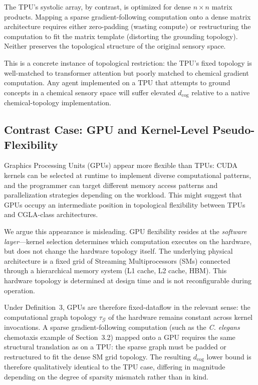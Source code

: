 \documentclass[12pt]{article}
\begin{document}
The TPU's systolic array, by contrast, is optimized for dense $n \times n$
matrix products. Mapping a sparse gradient-following computation onto a
dense matrix architecture requires either zero-padding (wasting compute)
or restructuring the computation to fit the matrix template (distorting
the grounding topology). Neither preserves the topological structure of
the original sensory space.

This is a concrete instance of topological restriction: the TPU's fixed
topology is well-matched to transformer attention but poorly matched to
chemical gradient computation. Any agent implemented on a TPU that
attempts to ground concepts in a chemical sensory space will suffer
elevated $d_{\mathrm{cog}}$ relative to a native chemical-topology
implementation.

\subsection{Contrast Case: GPU and Kernel-Level Pseudo-Flexibility}

Graphics Processing Units (GPUs) appear more flexible than TPUs:
CUDA kernels can be selected at runtime to implement diverse
computational patterns, and the programmer can target different
memory access patterns and parallelization strategies depending on
the workload. This might suggest that GPUs occupy an intermediate
position in topological flexibility between TPUs and CGLA-class
architectures.

We argue this appearance is misleading. GPU flexibility resides
at the \emph{software layer}---kernel selection determines which
computation executes on the hardware, but does not change the
hardware topology itself. The underlying physical architecture is
a fixed grid of Streaming Multiprocessors (SMs) connected through
a hierarchical memory system (L1 cache, L2 cache, HBM). This
hardware topology is determined at design time and is not
reconfigurable during operation.

Under Definition~3, GPUs are therefore fixed-dataflow in the
relevant sense: the computational graph topology $\tau_{\mathcal{G}}$
of the hardware remains constant across kernel invocations.
A sparse gradient-following computation (such as the
\textit{C. elegans} chemotaxis example of Section~3.2) mapped
onto a GPU requires the same structural translation as on a TPU:
the sparse graph must be padded or restructured to fit the
dense SM grid topology. The resulting $d_{\mathrm{cog}}$ lower
bound is therefore qualitatively identical to the TPU case,
differing in magnitude depending on the degree of sparsity
mismatch rather than in kind.
\end{document}
